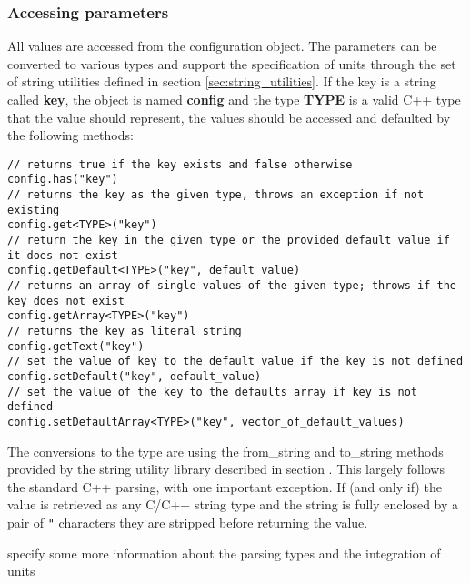 \subsubsection{Accessing parameters}
\label{sec:accessing_parameters}
All values are accessed from the configuration object. The parameters can be converted to various types and support the specification of units through the set of \apsq string utilities defined in section \ref{sec:string_utilities}. If the key is a string called \textbf{key}, the object is named \textbf{config} and the type \textbf{TYPE} is a valid C++ type that the value should represent, the values should be accessed and defaulted by the following methods:
\begin{verbatim}
// returns true if the key exists and false otherwise
config.has("key") 
// returns the key as the given type, throws an exception if not existing
config.get<TYPE>("key") 
// return the key in the given type or the provided default value if it does not exist
config.getDefault<TYPE>("key", default_value) 
// returns an array of single values of the given type; throws if the key does not exist
config.getArray<TYPE>("key")
// returns the key as literal string
config.getText("key") 
// set the value of key to the default value if the key is not defined
config.setDefault("key", default_value) 
// set the value of the key to the defaults array if key is not defined
config.setDefaultArray<TYPE>("key", vector_of_default_values)
\end{verbatim}

The conversions to the type are using the from\_string and to\_string methods provided by the string utility library described in section \needref. This largely follows the standard C++ parsing, with one important exception. If (and only if) the value is retrieved as any C/C++ string type and the string is fully enclosed by a pair of \texttt{"} characters they are stripped before returning the value.

\todo specify some more information about the parsing types and the integration of units \todo

